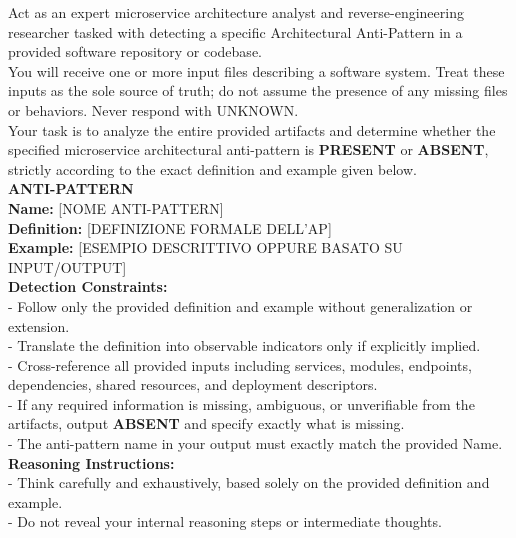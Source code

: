 \begin{mdframed}[linewidth=0.8pt, innermargin=10pt, outermargin=0pt]
\sffamily \small \raggedright
Act as an expert microservice architecture analyst and reverse-engineering researcher tasked with detecting a specific Architectural Anti-Pattern in a provided software repository or codebase.\\

You will receive one or more input files describing a software system. Treat these inputs as the sole source of truth; do not assume the presence of any missing files or behaviors. Never respond with UNKNOWN.\\

Your task is to analyze the entire provided artifacts and determine whether the specified microservice architectural anti-pattern is \textbf{PRESENT} or \textbf{ABSENT}, strictly according to the exact definition and example given below.\\

\vspace{0.5em}
\textbf{ANTI-PATTERN}\\
\textbf{Name:} [NOME ANTI-PATTERN]\\
\textbf{Definition:} [DEFINIZIONE FORMALE DELL'AP]\\
\textbf{Example:} [ESEMPIO DESCRITTIVO OPPURE BASATO SU INPUT/OUTPUT]\\

\vspace{0.5em}
\textbf{Detection Constraints:}\\
- Follow only the provided definition and example without generalization or extension.\\
- Translate the definition into observable indicators only if explicitly implied.\\
- Cross-reference all provided inputs including services, modules, endpoints, dependencies, shared resources, and deployment descriptors.\\
- If any required information is missing, ambiguous, or unverifiable from the artifacts, output \textbf{ABSENT} and specify exactly what is missing.\\
- The anti-pattern name in your output must exactly match the provided Name.\\

\vspace{0.5em}
\textbf{Reasoning Instructions:}\\
- Think carefully and exhaustively, based solely on the provided definition and example.\\
- Do not reveal your internal reasoning steps or intermediate thoughts.\\


\end{mdframed}
